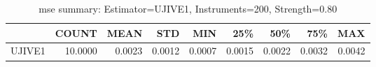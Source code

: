 \begin{table}[ht]
\centering
\caption{mse summary: Estimator=UJIVE1, Instruments=200, Strength=0.80}
\begin{tabular}{lrrrrrrrr}
\toprule
 & COUNT & MEAN & STD & MIN & 25\% & 50\% & 75\% & MAX \\
\midrule
UJIVE1 & 10.0000 & 0.0023 & 0.0012 & 0.0007 & 0.0015 & 0.0022 & 0.0032 & 0.0042 \\
\bottomrule
\end{tabular}
\end{table}
